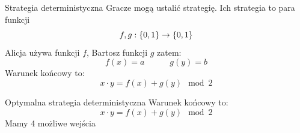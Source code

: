 \begin{frame}{Strategia deterministyczna}
    Gracze mogą ustalić strategię. Ich strategia to para funkcji 
    \[f,g:\left\{ 0,1 \right\} \to \left\{ 0,1 \right\}\]
    Alicja używa funkcji \(f\), Bartosz funkcji \(g\) zatem:
    \[f(x)=a \qquad \quad g(y)=b\]
    Warunek końcowy to:
    \[x\cdot y=f(x)+g(y) \mod{2}\]
\end{frame}
\begin{frame}{Optymalna strategia deterministyczna}
    Warunek końcowy to:
    \[x\cdot y=f(x)+g(y) \mod{2}\]
    Mamy 4 możliwe wejścia
\end{frame}
